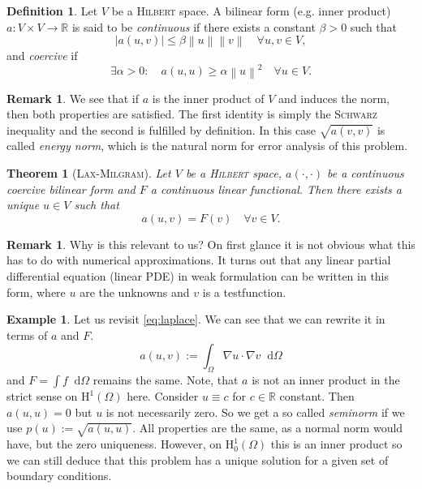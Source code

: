 \documentclass[12pt,a4paper,twoside, open=right]{scrreprt}
\theoremstyle{definition}
\newtheorem{rem}[auf]{Remark}
\newtheorem{defn}[auf]{Definition}
\newtheorem{bsp}[auf]{Example}
\theoremstyle{plain}
\newtheorem{sa}[auf]{Theorem}
\newcommand{\abs}[1]{\left\vert #1\right\vert}
\newcommand{\rr}{\mathbb{R}}
\newcommand{\norm}[1]{\left\lVert#1\right\rVert}
\newcommand{\D}{\mathop{}\!\mathrm{d}}
\begin{document}
\begin{defn}
    Let $V$ be a \textsc{Hilbert} space. A bilinear form (e.g. inner product) $a\colon V\times V\to\rr$ is said to be \emph{continuous} if there exists a constant $\beta>0$ such that
    \begin{equation}
        \abs{a(u,v)}\le\beta\norm{u}\norm{v}\quad \forall u,v\in V,
    \end{equation}
    and \emph{coercive} if 
    \begin{equation}
        \exists\alpha>0\colon \quad a(u,u)\ge \alpha\norm{u}^2\quad\forall u\in V.
    \end{equation}
\end{defn}
\begin{rem}
    We see that if $a$ is the inner product of $V$ and induces the norm, then both properties are satisfied. The first identity is simply the \textsc{Schwarz} inequality and the second is fulfilled by definition. In this case $\sqrt{a(v,v)}$ is called \emph{energy norm}, which is the natural norm for error analysis of this problem.
\end{rem}
\begin{sa}[\textsc{Lax-Milgram}]
    \label{sa:LaxMilgram}
    Let $V$ be a \textsc{Hilbert} space, $a(\cdot,\cdot)$ be a continuous coercive bilinear form and $F$ a continuous linear functional. Then there exists a unique $u\in V$ such that
    \begin{equation}
        a(u,v)=F(v)\quad \forall v\in V.
    \end{equation}
\end{sa}
\begin{rem}
    Why is this relevant to us? On first glance it is not obvious what this has to do with numerical approximations. It turns out that any linear partial differential equation (linear PDE) in weak formulation can be written in this form, where $u$ are the unknowns and $v$ is a testfunction.
\end{rem}
\begin{bsp}
    Let us revisit \eqref{eq:laplace}. We can see that we can rewrite it in terms of $a$ and $F$. 
    \begin{equation}
        a(u,v):=\int_\Omega \nabla u\cdot \nabla v\D\Omega
    \end{equation}
    and $F=\int f\D\Omega$ remains the same. Note, that $a$ is not an inner product in the strict sense on $\mathrm{H}^1(\Omega)$ here. Consider $u\equiv c$ for $c\in\rr$ constant. Then $a(u,u)=0$ but $u$ is not necessarily zero. So we get a so called \emph{seminorm} if we use $p(u):=\sqrt{a(u,u)}$. All properties are the same, as a normal norm would have, but the zero uniqueness. However, on $\mathrm{H}^1_0(\Omega)$ this is an inner product so we can still deduce that this problem has a unique solution for a given set of boundary conditions.
\end{bsp}
\end{document}
